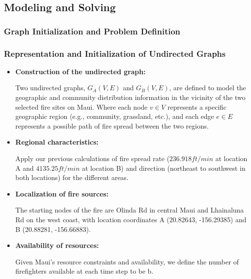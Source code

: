 \documentclass[12pt]{article}  %
\begin{document}
\subsection{Modeling and Solving}
\subsubsection{Graph Initialization and Problem Definition}
\subsubsection*{Representation and Initialization of Undirected Graphs}
\begin{itemize}
	\setlength{\parsep}{0ex} 
	\setlength{\topsep}{2ex} 
	\setlength{\itemsep}{1ex} 
	\item \textbf{Construction of the undirected graph:} 
	
	Two undirected graphs, $G_A(V, E)$ and $G_B(V, E)$, are defined to model the geographic and community distribution information in the vicinity of the two selected fire sites on Maui. \cite{8} Where each node $v \in V$ represents a specific geographic region (e.g., community, grassland, etc.), and each edge $e \in E$ represents a possible path of fire spread between the two regions.
	
	\item \textbf{Regional characteristics:} 
	
	Apply our previous calculations of fire spread rate ($236.918f t/min$ at location A and $4135.25f t/min$ at location B) and direction (northeast to southwest in both locations) for the different areas.
	
	\item \textbf{Localization of fire sources:} 
	
	The starting nodes of the fire are Olinda Rd in central Maui and Lhainaluna 
	Rd on the west coast, with location coordinates A (20.82643, -156.29385) and B (20.88281, -156.66883).
	
	\item \textbf{Availability of resources:} 
	
	Given Maui's resource constraints and availability, we define the number of firefighters available at each time step to be b.
\end{itemize}
\end{document}
